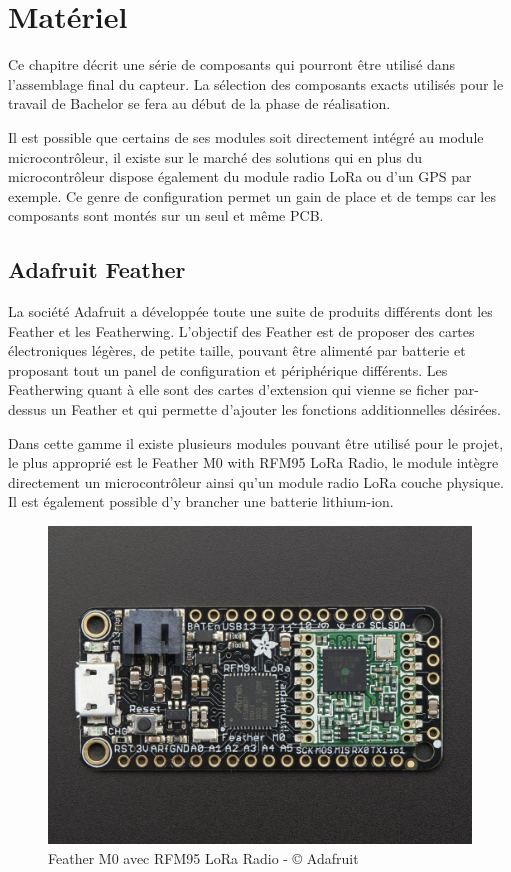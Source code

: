 \section{Matériel}

Ce chapitre décrit une série de composants qui pourront être utilisé dans l’assemblage final du capteur. La sélection des composants exacts utilisés pour le travail de Bachelor se fera au début de la phase de réalisation.

Il est possible que certains de ses modules soit directement intégré au module microcontrôleur, il existe sur le marché des solutions qui en plus du microcontrôleur dispose également du module radio LoRa ou d’un GPS par exemple. Ce genre de configuration permet un gain de place et de temps car les composants sont montés sur un seul et même PCB.

\subsection{Adafruit Feather}

La société Adafruit a développée toute une suite de produits différents dont les Feather et les Featherwing. L’objectif des Feather est de proposer des cartes électroniques légères, de petite taille, pouvant être alimenté par batterie et proposant tout un panel de configuration et périphérique différents. Les Featherwing quant à elle sont des cartes d’extension qui vienne se ficher par-dessus un Feather et qui permette d’ajouter les fonctions additionnelles désirées.

Dans cette gamme il existe plusieurs modules pouvant être utilisé pour le projet, le plus approprié est le Feather M0 with RFM95 LoRa Radio, le module intègre directement un microcontrôleur ainsi qu’un module radio LoRa couche physique. Il est également possible d’y brancher une batterie lithium-ion.

\begin{figure}[htb]
\centering 
\includegraphics[width=0.4\columnwidth]{../images/adafruit-feather-m0-lora.jpg} 
\caption[Feather M0 avec RFM95 LoRa Radio]{Feather M0 avec RFM95 LoRa Radio - © Adafruit}
\label{fig:ada_feather}
\end{figure}

